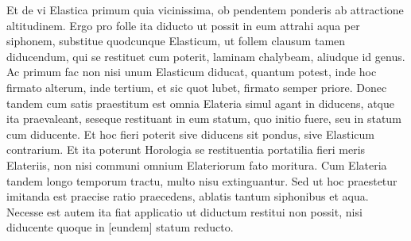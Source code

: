 \pstart [199 r\textsuperscript{o}] Et de vi Elastica\protect{} primum quia vicinissima, ob pendentem ponderis ab attractione altitudinem. Ergo pro folle ita diducto ut possit in eum attrahi aqua per siphonem\protect{}, substitue quodcunque Elasticum, ut follem clausum tamen diducendum, qui se restituet cum poterit, laminam chalybeam, aliudque id genus. Ac primum fac non nisi unum Elasticum diducat, quantum potest, inde hoc firmato alterum, inde tertium, et sic quot lubet, firmato semper priore. Donec tandem cum satis praestitum est omnia Elateria\protect{} simul  agant in diducens, atque ita praevaleant, seseque restituant in eum statum, quo initio fuere, seu in statum  cum diducente. Et hoc fieri poterit sive diducens  sit pondus, sive Elasticum contrarium. Et ita  poterunt Horologia\protect{} se restituentia portatilia fieri meris Elateriis\protect{}, non nisi communi omnium Elateriorum\protect{} fato moritura.  Cum Elateria\protect{} tandem longo temporum tractu, multo nisu extinguantur. Sed  ut hoc praestetur imitanda est praecise  ratio praecedens, ablatis tantum siphonibus\protect{}  et aqua. Necesse est autem ita fiat  applicatio ut diductum restitui non possit,  nisi diducente quoque in [eundem] statum  reducto.\pend 